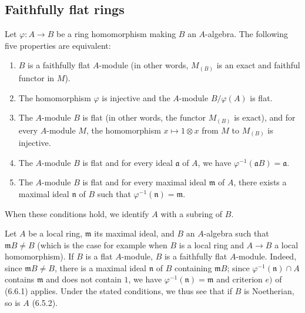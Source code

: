 \subsection{Faithfully flat rings}
\label{subsection:0.6.6}

\begin{env}[6.6.1]
\label{0.6.6.1}
Let $\varphi:A\to B$ be a ring homomorphism making $B$ an
$A$-algebra. The following five properties are equivalent:
\begin{enumerate}
  \item[$a)$] $B$ is a faithfully flat $A$-module (in other words,
    $M_{(B)}$ is an exact and faithful functor in $M$).
  \item[$b)$] The homomorphism $\varphi$ is injective and the $A$-module
    $B/\varphi(A)$ is flat.


  \item[$c)$] The $A$-module $B$ is flat (in other words, the functor
    $M_{(B)}$ is exact), and for every $A$-module $M$, the homomorphism
    $x\mapsto1\otimes x$ from $M$ to $M_{(B)}$ is injective.
  \item[$d)$] The $A$-module $B$ is flat and for every ideal $\mathfrak a$ of
    $A$, we have $\varphi^{-1}(\mathfrak aB)=\mathfrak a$.
  \item[$e)$] The $A$-module $B$ is flat and for every maximal ideal
    $\mathfrak m$ of $A$, there exists a maximal ideal $\mathfrak n$ of $B$ such
    that $\varphi^{-1}(\mathfrak n)=\mathfrak m$.
\end{enumerate}

When these conditions hold, we identify $A$ with a subring of $B$.
\end{env}

\begin{env}[6.6.2]
\label{0.6.6.2}
Let $A$ be a local ring, $\mathfrak m$ its maximal ideal, and $B$ an
$A$-algebra such that $\mathfrak mB\neq B$ (which is the case for example when
$B$ is a local ring and $A\to B$ a local homomorphism). If $B$ is a
flat $A$-module, $B$ is a faithfully flat $A$-module. Indeed, since
$\mathfrak mB\neq B$, there is a maximal ideal $\mathfrak n$ of $B$ containing
$\mathfrak mB$; since $\varphi^{-1}(\mathfrak n)\cap A$ contains
$\mathfrak m$ and does not contain $1$, we have
$\varphi^{-1}(\mathfrak n)=\mathfrak m$ and criterion $e)$ of (6.6.1)
applies. Under the stated conditions, we thus see that if $B$ is
Noetherian, so is $A$ (6.5.2).
\end{env}

